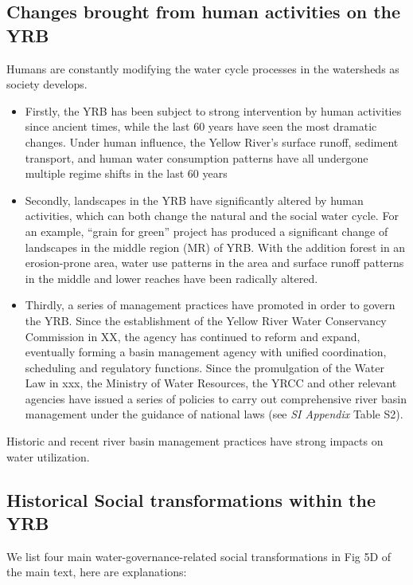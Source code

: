 \documentclass[9pt,twoside,lineno]{pnas-new}
\begin{document}
\subsection*{Changes brought from human activities on the YRB}
Humans are constantly modifying the water cycle processes in the watersheds as society develops.
\begin{itemize}
    \item Firstly, the YRB has been subject to strong intervention by human activities since ancient times, while the last 60 years have seen the most dramatic changes. Under human influence, the Yellow River's surface runoff, sediment transport, and human water consumption patterns have all undergone multiple regime shifts in the last 60 years
    \item Secondly, landscapes in the YRB have significantly altered by human activities, which can both change the natural and the social water cycle. For an example, “grain for green” project has produced a significant change of landscapes in the middle region (MR) of YRB. With the addition forest in an erosion-prone area, water use patterns in the area and surface runoff patterns in the middle and lower reaches have been radically altered.
    \item Thirdly, a series of management practices have promoted in order to govern the YRB. Since the establishment of the Yellow River Water Conservancy Commission in XX, the agency has continued to reform and expand, eventually forming a basin management agency with unified coordination, scheduling and regulatory functions. Since the promulgation of the Water Law in xxx, the Ministry of Water Resources, the YRCC and other relevant agencies have issued a series of policies to carry out comprehensive river basin management under the guidance of national laws (see \textit{SI Appendix} Table S2).
\end{itemize}
Historic and recent river basin management practices have strong impacts on water utilization.

\subsection*{Historical Social transformations within the YRB}

We list four main water-governance-related social transformations in Fig 5D of the main text, here are explanations: 
\end{document}
